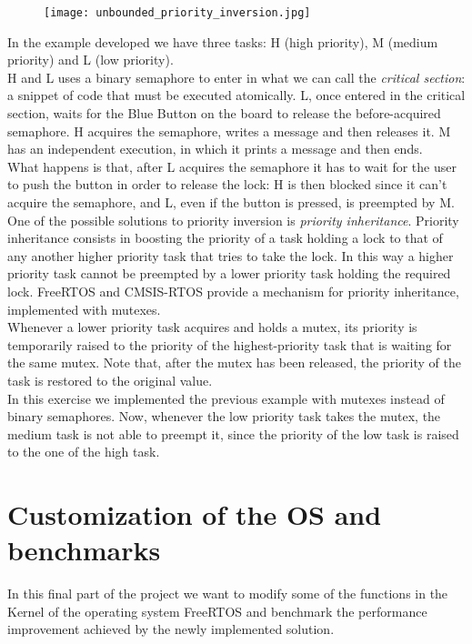 \documentclass[a4paper,11pt]{report}
\begin{document}
\begin{figure}[H]
    \centering
    \texttt{[image: unbounded\_priority\_inversion.jpg]}
\end{figure}

In the example developed we have three tasks: H (high priority), M (medium priority) and L (low priority). \\
H and L uses a binary semaphore to enter in what we can call the \textit{critical section}: a snippet of code that must be executed atomically. L, once entered in the critical section, waits for the Blue Button on the board to release the before-acquired semaphore. H acquires the semaphore, writes a message and then releases it. M has an independent execution, in which it prints a message and then ends.\\
What happens is that, after L acquires the semaphore it has to wait for the user to push the button in order to release the lock: H is then blocked since it can't acquire the semaphore, and L, even if the button is pressed, is preempted by M. \\
One of the possible solutions to priority inversion is \textit{priority inheritance}. Priority inheritance consists in boosting the priority of a task holding a lock to that of any another higher priority task that tries to take the lock. In this way a higher priority task cannot be preempted by a lower priority task holding the required lock.
FreeRTOS and CMSIS-RTOS provide a mechanism for priority inheritance, implemented with mutexes. \\
Whenever a lower priority task acquires and holds a mutex, its priority is temporarily raised to the priority of the highest-priority task that is waiting for the same mutex. Note that, after the mutex has been released, the priority of the task is restored to the original value.\\
In this exercise we implemented the previous example with mutexes instead of binary semaphores. Now, whenever the low priority task takes the mutex, the medium task is not able to preempt it, since the priority of the low task is raised to the one of the high task. \\


\section{Customization of the OS and benchmarks}
In this final part of the project we want to modify some of the functions in the Kernel of the operating system FreeRTOS and benchmark the performance improvement achieved by the newly implemented solution.
\end{document}
